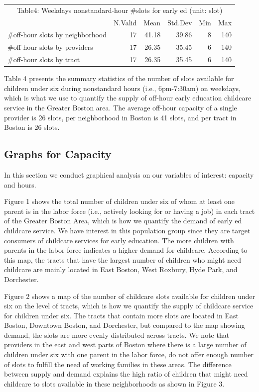\documentclass[10pt,letterpaper]{article}
\begin{document}
\begin{table}[!h]
\centering\begingroup\fontsize{10}{12}\selectfont

\begin{tabular}{l|r|r|r|r|r}
\hline
\multicolumn{6}{c|}{Table4: Weekdays nonstandard-hour \#slots for early ed (unit: slot)} \\
\cline{1-6}
  & N.Valid & Mean & Std.Dev & Min & Max\\
\hline
\rowcolor{gray!6}  \#off-hour slots by neighborhood & 17 & 41.18 & 39.86 & 8 & 140\\
\hline
\#off-hour slots by providers & 17 & 26.35 & 35.45 & 6 & 140\\
\hline
\rowcolor{gray!6}  \#off-hour slots by tract & 17 & 26.35 & 35.45 & 6 & 140\\
\hline
\end{tabular}
\endgroup{}
\end{table}

Table 4 presents the summary statistics of the number of slots available
for children under six during nonstandard hours (i.e., 6pm-7:30am) on
weekdays, which is what we use to quantify the supply of off-hour early
education childcare service in the Greater Boston area. The average
off-hour capacity of a single provider is 26 slots, per neighborhood in
Boston is 41 slots, and per tract in Boston is 26 slots.

\subsection{Graphs for Capacity}\label{graphs-for-capacity}

In this section we conduct graphical analysis on our variables of
interest: capacity and hours.

Figure 1 shows the total number of children under six of whom at least
one parent is in the labor force (i.e., actively looking for or having a
job) in each tract of the Greater Boston Area, which is how we quantify
the demand of early ed childcare service. We have interest in this
population group since they are target consumers of childcare services
for early education. The more children with parents in the labor force
indicates a higher demand for childcare. According to this map, the
tracts that have the largest number of children who might need childcare
are mainly located in East Boston, West Roxbury, Hyde Park, and
Dorchester.

Figure 2 shows a map of the number of childcare slots available for
children under six on the level of tracts, which is how we quantify the
supply of childcare service for children under six. The tracts that
contain more slots are located in East Boston, Downtown Boston, and
Dorchester, but compared to the map showing demand, the slots are more
evenly distributed across tracts. We note that providers in the east and
west parts of Boston where there is a large number of children under six
with one parent in the labor force, do not offer enough number of slots
to fulfill the need of working families in these areas. The difference
between supply and demand explains the high ratio of children that might
need childcare to slots available in these neighborhoods as shown in
Figure 3.
\end{document}
